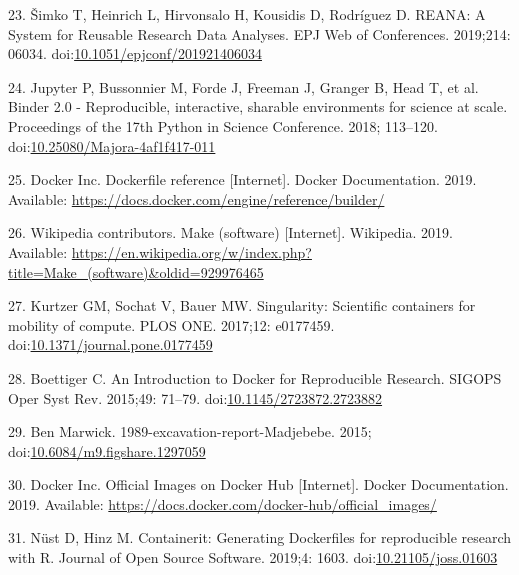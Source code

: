 \documentclass[10pt,letterpaper]{article}
\begin{document}
\leavevmode\hypertarget{ref-simko_reana_2019}{}%
23. Šimko T, Heinrich L, Hirvonsalo H, Kousidis D, Rodríguez D. REANA: A
System for Reusable Research Data Analyses. EPJ Web of Conferences.
2019;214: 06034.
doi:\href{https://doi.org/10.1051/epjconf/201921406034}{10.1051/epjconf/201921406034}

\leavevmode\hypertarget{ref-jupyter_binder_2018}{}%
24. Jupyter P, Bussonnier M, Forde J, Freeman J, Granger B, Head T, et
al. Binder 2.0 - Reproducible, interactive, sharable environments for
science at scale. Proceedings of the 17th Python in Science Conference.
2018; 113--120.
doi:\href{https://doi.org/10.25080/Majora-4af1f417-011}{10.25080/Majora-4af1f417-011}

\leavevmode\hypertarget{ref-docker_inc_dockerfile_2019}{}%
25. Docker Inc. Dockerfile reference {[}Internet{]}. Docker
Documentation. 2019. Available:
\url{https://docs.docker.com/engine/reference/builder/}

\leavevmode\hypertarget{ref-wikipedia_contributors_make_2019}{}%
26. Wikipedia contributors. Make (software) {[}Internet{]}. Wikipedia.
2019. Available:
\url{https://en.wikipedia.org/w/index.php?title=Make_(software)\&oldid=929976465}

\leavevmode\hypertarget{ref-kurtzer_singularity_2017}{}%
27. Kurtzer GM, Sochat V, Bauer MW. Singularity: Scientific containers
for mobility of compute. PLOS ONE. 2017;12: e0177459.
doi:\href{https://doi.org/10.1371/journal.pone.0177459}{10.1371/journal.pone.0177459}

\leavevmode\hypertarget{ref-boettiger_introduction_2015}{}%
28. Boettiger C. An Introduction to Docker for Reproducible Research.
SIGOPS Oper Syst Rev. 2015;49: 71--79.
doi:\href{https://doi.org/10.1145/2723872.2723882}{10.1145/2723872.2723882}

\leavevmode\hypertarget{ref-marwick_madjebebe_2015}{}%
29. Ben Marwick. 1989-excavation-report-Madjebebe. 2015;
doi:\href{https://doi.org/10.6084/m9.figshare.1297059}{10.6084/m9.figshare.1297059}

\leavevmode\hypertarget{ref-docker_inc_official_2019}{}%
30. Docker Inc. Official Images on Docker Hub {[}Internet{]}. Docker
Documentation. 2019. Available:
\url{https://docs.docker.com/docker-hub/official_images/}

\leavevmode\hypertarget{ref-nust_containerit_2019}{}%
31. Nüst D, Hinz M. Containerit: Generating Dockerfiles for reproducible
research with R. Journal of Open Source Software. 2019;4: 1603.
doi:\href{https://doi.org/10.21105/joss.01603}{10.21105/joss.01603}
\end{document}
